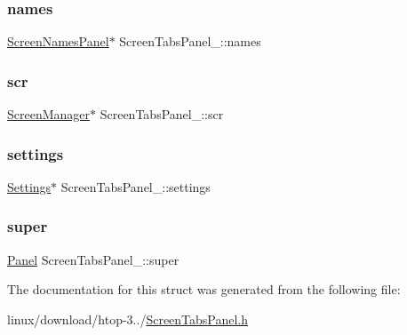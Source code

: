 \mbox{\label{structScreenTabsPanel___aed5d1ad78aabe951a7c3871713f98ee9}} 
\subsubsection{\texorpdfstring{names}{names}}
{\footnotesize\ttfamily \hyperlink{ScreenTabsPanel_8h_a84aa43c201d271221a4cf53cd978fc6a}{Screen\+Names\+Panel}$\ast$ Screen\+Tabs\+Panel\+\_\+\+::names}

\mbox{\label{structScreenTabsPanel___aa84aea6c71b89aeae10befc97ba9c097}} 
\subsubsection{\texorpdfstring{scr}{scr}}
{\footnotesize\ttfamily \hyperlink{ScreenManager_8h_a798c9c69dc8024a4c6829982bf94dddd}{Screen\+Manager}$\ast$ Screen\+Tabs\+Panel\+\_\+\+::scr}

\mbox{\label{structScreenTabsPanel___a4a257a802f9cff5d3656a4af82655e2b}} 
\subsubsection{\texorpdfstring{settings}{settings}}
{\footnotesize\ttfamily \hyperlink{Settings_8h_ad97e5960b63f21c02bf5e0e43c0ef002}{Settings}$\ast$ Screen\+Tabs\+Panel\+\_\+\+::settings}

\mbox{\label{structScreenTabsPanel___a07be6745915978bd25e69ba505ae68e2}} 
\subsubsection{\texorpdfstring{super}{super}}
{\footnotesize\ttfamily \hyperlink{Panel_8h_a034d4c16521db412dc7a1e8536d16fae}{Panel} Screen\+Tabs\+Panel\+\_\+\+::super}



The documentation for this struct was generated from the following file\+:\begin{DoxyCompactItemize}
\item 
linux/download/htop-\/3../\hyperlink{ScreenTabsPanel_8h}{Screen\+Tabs\+Panel.\+h}\end{DoxyCompactItemize}
